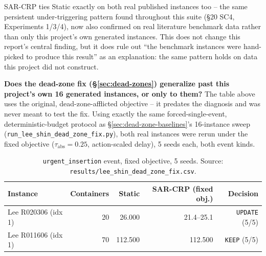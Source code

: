 \documentclass[11pt]{article}
\begin{document}
SAR-CRP ties Static exactly on both real published instances too -- the
same persistent under-triggering pattern found throughout this suite
(\S20 SC4, Experiments 1/3/4), now also confirmed on real literature
benchmark data rather than only this project's own generated instances.
This does not change this report's central finding, but it does rule out
``the benchmark instances were hand-picked to produce this result'' as an
explanation: the same pattern holds on data this project did not construct.

\textbf{Does the dead-zone fix (\S\ref{sec:dead-zones}) generalize past
this project's own 16 generated instances, or only to them?} The table
above uses the original, dead-zone-afflicted objective -- it predates the
diagnosis and was never meant to test the fix. Using exactly the same
forced-single-event, deterministic-budget protocol as
\S\ref{sec:dead-zone-baselines}'s 16-instance sweep
(\texttt{run\_lee\_shin\_dead\_zone\_fix.py}), both real instances were
rerun under the fixed objective ($\tau_{\text{abs}}=0.25$,
action-scaled delay), 5 seeds each, both event kinds.

\begin{table}[h]
\centering
\small
\begin{tabular}{lrrrr}
\hline
Instance & Containers & Static & SAR-CRP (fixed obj.) & Decision \\
\hline
Lee R020306 (idx 1) & 20 & 26.000 & 21.4--25.1 & \texttt{UPDATE} (5/5) \\
Lee R011606 (idx 1) & 70 & 112.500 & 112.500 & \texttt{KEEP} (5/5) \\
\hline
\end{tabular}
\caption{\texttt{urgent\_insertion} event, fixed objective, 5 seeds. Source:
\texttt{results/lee\_shin\_dead\_zone\_fix.csv}.}
\label{tab:lee-shin-fix}
\end{table}
\end{document}
